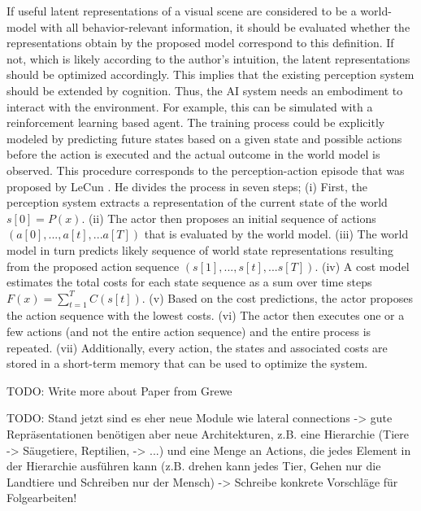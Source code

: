 If useful latent representations of a visual scene are considered to be a world-model with all behavior-relevant information, it should be evaluated whether the representations obtain by the proposed model correspond to this definition.
If not, which is likely according to the author's intuition, the latent representations should be optimized accordingly.
This implies that the existing perception system should be extended by cognition.
Thus, the AI system needs an embodiment to interact with the environment.
For example, this can be simulated with a reinforcement learning based agent.
The training process could be explicitly modeled by predicting future states based on a given state and possible actions before the action is executed and the actual outcome in the world model is observed.
This procedure corresponds to the perception-action episode that was proposed by LeCun .
He divides the process in seven steps;
(i) First, the perception system extracts a representation of the current state of the world \(s[0]=P(x)\). (ii) The actor then proposes an initial sequence of actions \((a[0], ..., a[t], ... a[T])\) that is evaluated by the world model. (iii) The world model in turn predicts likely sequence of world state representations resulting from the proposed action sequence \((s[1], ..., s[t], ... s[T])\). (iv) A cost model estimates the total costs for each state sequence as a sum over time steps \(F(x)=\sum_{t=1}^{T}C(s[t])\). (v) Based on the cost predictions, the actor proposes the action sequence with the lowest costs. (vi) The actor then executes one or a few actions (and not the entire action sequence) and the entire process is repeated. (vii) Additionally, every action, the states and associated costs are stored in a short-term memory that can be used to optimize the system.

TODO: Write more about Paper from Grewe 


TODO: Stand jetzt sind es eher neue Module wie lateral connections -> gute Repräsentationen benötigen aber neue Architekturen, z.B. eine Hierarchie (Tiere -> Säugetiere, Reptilien, -> ...) und eine Menge an Actions, die jedes Element in der Hierarchie ausführen kann (z.B. drehen kann jedes Tier, Gehen nur die Landtiere und Schreiben nur der Mensch) -> Schreibe konkrete Vorschläge für Folgearbeiten!



